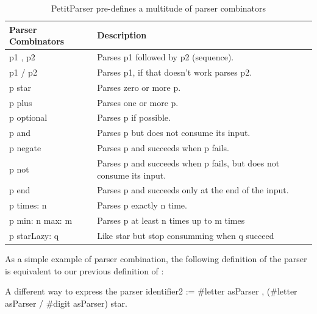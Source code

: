 \documentclass[a4paper,10pt,twoside]{book}
\begin{document}
\begin{table}
  \centering
  \begin{tabular}{lp{}}
    \textbf{Parser Combinators} & \textbf{Description}                                                \\
    \midrule
    p1 , p2                     & Parses p1 followed by p2 (sequence).                                \\
    p1 / p2                     & Parses p1, if that doesn't work parses p2.                          \\
    p star                      & Parses zero or more p.                                              \\
    p plus                      & Parses one or more p.                                               \\
    p optional                  & Parses p if possible.                                               \\
    p and                       & Parses p but does not consume its input.                            \\
    p negate                    & Parses p and succeeds when p fails.                                 \\
    p not                       & Parses p and succeeds when p fails, but does not consume its input. \\
    p end                       & Parses p and succeeds only at the end of the input.                 \\
    p times: n                       & Parses p exactly n time. \\
    p min: n max: m             &Parses p at least n times up to m times \\
    p starLazy: q                &Like star but stop consumming when q succeed  \\

  \end{tabular}
  \caption{PetitParser pre-defines a multitude of parser combinators}
  \label{tab:parser-combinators}
\end{table}

As a simple example of parser combination, the following definition of
the  parser is equivalent to our previous definition
of :

\begin{script}[identifier2]{A different way to express the  parser}
identifier2 := #letter asParser , (#letter asParser / #digit asParser) star.
\end{script}
\end{document}
